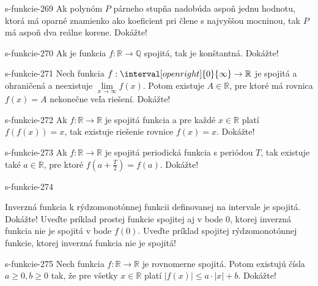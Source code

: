 \begin{defproblem}{s-funkcie-269}
Ak polynóm $P$ párneho stupňa nadobúda aspoň jednu hodnotu, ktorá má oparné
znamienko ako koeficient pri člene s najvyššou mocninou, tak $P$ má aspoň dva
reálne korene. Dokážte!
\end{defproblem}

\begin{defproblem}{s-funkcie-270}
Ak je funkcia $f: \mathbb{R} \rightarrow \mathbb{Q}$ spojitá, tak je konštantná.
Dokážte!
\end{defproblem}

\begin{defproblem}{s-funkcie-271}
Nech funkcia $f: \interval[open right]{0}{\infty} \rightarrow \mathbb{R}$ je
spojitá a ohraničená a neexistuje $\lim\limits_{x \rightarrow \infty}f(x)$.
Potom existuje $A \in \mathbb{R}$, pre ktoré má rovnica $f(x)=A$ nekonečne veľa
riešení. Dokážte!
\end{defproblem}

\begin{defproblem}{s-funkcie-272}
Ak $f: \mathbb{R} \rightarrow \mathbb{R}$ je spojitá funkcia a pre každé $x \in
\mathbb{R}$ platí $f(f(x))=x$, tak existuje riešenie rovnice $f(x)=x$. Dokážte!
\end{defproblem}

\begin{defproblem}{s-funkcie-273}
Ak $f: \mathbb{R} \rightarrow \mathbb{R}$ je spojitá periodická funkcia s
periódou $T$, tak existuje také $a \in \mathbb{R}$, pre ktoré
$f(a+\frac{T}{2})=f(a)$. Dokážte!
\end{defproblem}

\begin{defproblem}{s-funkcie-274}
\par
{}
\begin{tasks}
  \task
    Inverzná funkcia k rýdzomonotónnej funkcii definovanej na intervale je
    spojitá. Dokážte!
  \task
    Uveďte príklad prostej funkcie spojitej aj v bode $0$, ktorej inverzná
    funkcia nie je spojitá v bode $f(0)$.
  \task
    Uveďte príklad spojitej rýdzomonotónnej funkcie, ktorej inverzná funkcia
    nie je spojitá!
\end{tasks}
\end{defproblem}

\begin{defproblem}{s-funkcie-275}
Nech funkcia $f: \mathbb{R} \rightarrow \mathbb{R}$ je rovnomerne spojitá. Potom
existujú čísla $a \geq 0,b \geq 0$ tak, že pre všetky $x \in \mathbb{R}$ platí
$|f(x)| \leq a \cdot |x|+b$. Dokážte!
\end{defproblem}

